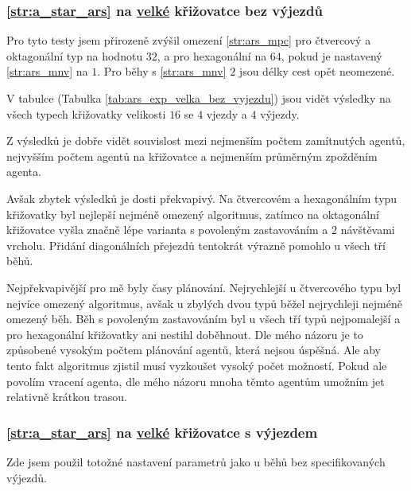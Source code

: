 

\subsubsection{\ref{str:a_star_ars} na \hyperref[par:data_velka]{velké} křižovatce bez výjezdů}
\label{subsubsec:exp_ars_velka_krizovatka_bez_vyjezdu}

Pro tyto testy jsem přirozeně zvýšil omezení \ref{str:ars_mpc} pro čtvercový a oktagonální typ na hodnotu $32$,
a pro hexagonální na $64$, pokud je nastavený \ref{str:ars_mnv} na $1$.
Pro běhy s \ref{str:ars_mnv} $2$ jsou délky cest opět neomezené.

V tabulce (Tabulka \ref{tab:ars_exp_velka_bez_vyjezdu}) jsou vidět výsledky na všech typech křižovatky
velikosti $16$ se $4$ vjezdy a $4$ výjezdy.

Z výsledků je dobře vidět souvislost mezi nejmenším počtem zamítnutých agentů, nejvyšším počtem agentů na křižovatce a
nejmenším průměrným zpožděním agenta.

Avšak zbytek výsledků je dosti překvapivý.
Na čtvercovém a hexagonálním typu křižovatky byl nejlepší nejméně omezený algoritmus,
zatímco na oktagonální křižovatce vyšla značně lépe varianta s povoleným zastavováním a $2$ návštěvami vrcholu.
Přidání diagonálních přejezdů tentokrát výrazně pomohlo u všech tří běhů.

Nejpřekvapivější pro mě byly časy plánování.
Nejrychlejší u čtvercového typu byl nejvíce omezený algoritmus,
avšak u zbylých dvou typů běžel nejrychleji nejméně omezený běh.
Běh s povoleným zastavováním byl u všech tří typů nejpomalejší a pro hexagonální křižovatky ani nestihl doběhnout.
Dle mého názoru je to způsobené vysokým počtem plánování agentů, která nejsou úspěšná.
Ale aby tento fakt algoritmus zjistil musí vyzkoušet vysoký počet možností.
Pokud ale povolím vracení agenta, dle mého názoru mnoha těmto agentům umožním jet relativně krátkou trasou.



\subsubsection{\ref{str:a_star_ars} na \hyperref[par:data_velka]{velké} křižovatce s výjezdem}
\label{subsubsec:exp_ars_velka_krizovatka_s_vyjezdem}

Zde jsem použil totožné nastavení parametrů jako u běhů bez specifikovaných výjezdů.

